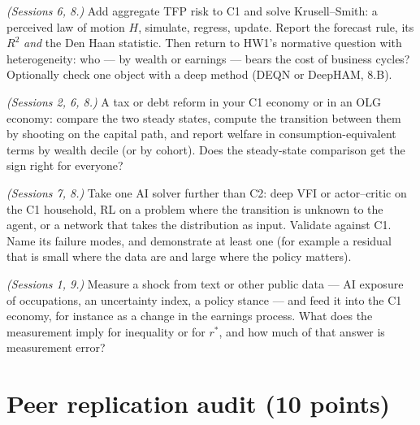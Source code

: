 \documentclass[11pt]{article}
\newif\ifsolutions \solutionsfalse
\newcommand{\solution}[1]{\ifsolutions\medskip
  {\color{blue!45!black}\textbf{Solution.} #1}\medskip\fi}
\begin{document}
\begin{description}[leftmargin=0pt, itemsep=4pt]
\item[H1. Aggregate risk and who bears it] \emph{(Sessions 6, 8.)} Add aggregate TFP risk to C1 and
  solve Krusell--Smith: a perceived law of motion $H$, simulate, regress, update. Report the
  forecast rule, its $R^2$ \emph{and} the Den Haan statistic. Then return to HW1's normative question
  with heterogeneity: who --- by wealth or earnings --- bears the cost of business cycles?
  Optionally check one object with a deep method (DEQN or DeepHAM, 8.B).
\item[H2. Fiscal policy and the transition] \emph{(Sessions 2, 6, 8.)} A tax or debt reform in your
  C1 economy or in an OLG economy: compare the two steady states, compute the transition between
  them by shooting on the capital path, and report welfare in consumption-equivalent terms by wealth
  decile (or by cohort). Does the steady-state comparison get the sign right for everyone?
\item[H3. A learning method, pushed] \emph{(Sessions 7, 8.)} Take one AI solver further than C2:
  deep VFI or actor--critic on the C1 household, RL on a problem where the transition is unknown to
  the agent, or a network that takes the distribution as input. Validate against C1. Name its
  failure modes, and demonstrate at least one (for example a residual that is small where the data
  are and large where the policy matters).
\item[H4. Text-disciplined heterogeneity] \emph{(Sessions 1, 9.)} Measure a shock from text or other
  public data --- AI exposure of occupations, an uncertainty index, a policy stance --- and feed it into
  the C1 economy, for instance as a change in the earnings process. What does the measurement imply for
  inequality or for $r^*$, and how much of that answer is measurement error?
\end{description}

\solution{\keyDthree}

\section*{Peer replication audit (10 points)}
\end{document}
